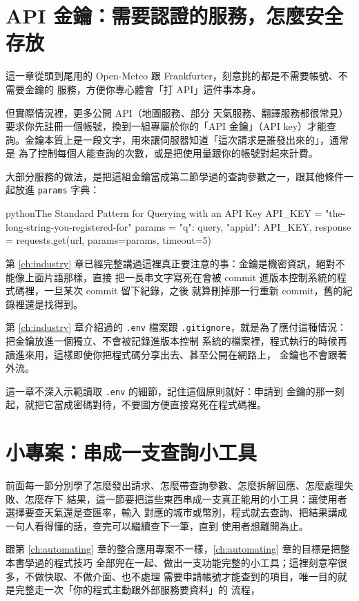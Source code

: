 \section{API 金鑰：需要認證的服務，怎麼安全存放}
\label{sec:api-keys}

這一章從頭到尾用的 Open-Meteo 跟 Frankfurter，刻意挑的都是不需要帳號、不需要金鑰的
服務，方便你專心體會「打 API」這件事本身。

但實際情況裡，更多公開 API（地圖服務、部分
天氣服務、翻譯服務都很常見）要求你先註冊一個帳號，換到一組專屬於你的「API 金鑰」（API
key）才能查詢。金鑰本質上是一段文字，用來讓伺服器知道「這次請求是誰發出來的」，通常是
為了控制每個人能查詢的次數，或是把使用量跟你的帳號對起來計費。

大部分服務的做法，是把這組金鑰當成第二節學過的查詢參數之一，跟其他條件一起放進
\texttt{params} 字典：

\begin{code}{python}{The Standard Pattern for Querying with an API Key}
API_KEY = "the-long-string-you-registered-for"
params = {
    "q": query,
    "appid": API_KEY,
}
response = requests.get(url, params=params, timeout=5)
\end{code}

第 \ref{ch:industry} 章已經完整講過這裡真正要注意的事：金鑰是機密資訊，絕對不能像上面片語那樣，直接
把一長串文字寫死在會被 commit 進版本控制系統的程式碼裡，一旦某次 commit 留下紀錄，之後
就算刪掉那一行重新 commit，舊的紀錄裡還是找得到。

第 \ref{ch:industry} 章介紹過的 \texttt{.env} 檔案跟
\texttt{.gitignore}，就是為了應付這種情況：把金鑰放進一個獨立、不會被記錄進版本控制
系統的檔案裡，程式執行的時候再讀進來用，這樣即使你把程式碼分享出去、甚至公開在網路上，
金鑰也不會跟著外流。

這一章不深入示範讀取 \texttt{.env} 的細節，記住這個原則就好：申請到
金鑰的那一刻起，就把它當成密碼對待，不要圖方便直接寫死在程式碼裡。

\section{小專案：串成一支查詢小工具}
\label{sec:weather-tool}

前面每一節分別學了怎麼發出請求、怎麼帶查詢參數、怎麼拆解回應、怎麼處理失敗、怎麼存下
結果，這一節要把這些東西串成一支真正能用的小工具：讓使用者選擇要查天氣還是查匯率，輸入
對應的城市或幣別，程式就去查詢、把結果講成一句人看得懂的話，查完可以繼續查下一筆，直到
使用者想離開為止。

跟第 \ref{ch:automating} 章的整合應用專案不一樣，\ref{ch:automating} 章的目標是把整本書學過的程式技巧
全部兜在一起、做出一支功能完整的小工具；這裡刻意窄很多，不做快取、不做介面、也不處理
需要申請帳號才能查到的項目，唯一目的就是完整走一次「你的程式主動跟外部服務要資料」的
流程，


